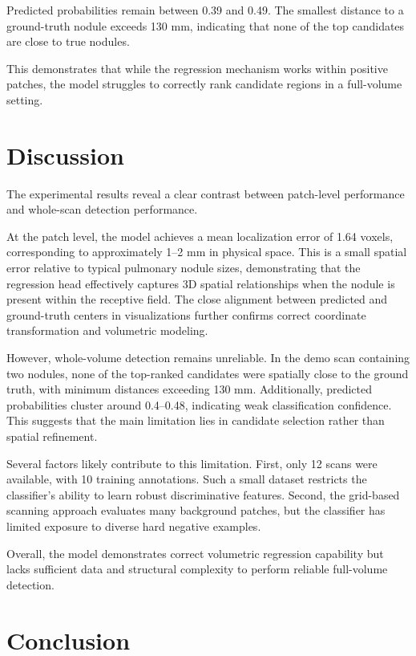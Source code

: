 \documentclass[conference]{IEEEtran}
\begin{document}
Predicted probabilities remain between 0.39 and 0.49. The smallest distance to a ground-truth nodule exceeds 130 mm, indicating that none of the top candidates are close to true nodules.

This demonstrates that while the regression mechanism works within positive patches, the model struggles to correctly rank candidate regions in a full-volume setting.

\section{Discussion}

The experimental results reveal a clear contrast between patch-level performance and whole-scan detection performance.

At the patch level, the model achieves a mean localization error of 1.64 voxels, corresponding to approximately 1--2 mm in physical space. This is a small spatial error relative to typical pulmonary nodule sizes, demonstrating that the regression head effectively captures 3D spatial relationships when the nodule is present within the receptive field. The close alignment between predicted and ground-truth centers in visualizations further confirms correct coordinate transformation and volumetric modeling.

However, whole-volume detection remains unreliable. In the demo scan containing two nodules, none of the top-ranked candidates were spatially close to the ground truth, with minimum distances exceeding 130 mm. Additionally, predicted probabilities cluster around 0.4--0.48, indicating weak classification confidence. This suggests that the main limitation lies in candidate selection rather than spatial refinement.

Several factors likely contribute to this limitation. First, only 12 scans were available, with 10 training annotations. Such a small dataset restricts the classifier's ability to learn robust discriminative features. Second, the grid-based scanning approach evaluates many background patches, but the classifier has limited exposure to diverse hard negative examples.

Overall, the model demonstrates correct volumetric regression capability but lacks sufficient data and structural complexity to perform reliable full-volume detection.

\section{Conclusion}
\end{document}
